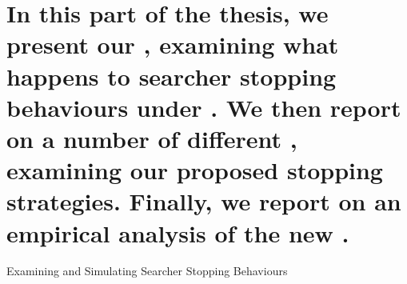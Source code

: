 
\part[Examining Searcher Stopping Behaviours]{In this part of the thesis, we present our , examining what happens to searcher stopping behaviours under . We then report on a number of different , examining our proposed stopping strategies. Finally, we report on an empirical analysis of the new .}{Examining and Simulating Searcher Stopping Behaviours}\label{part:context}